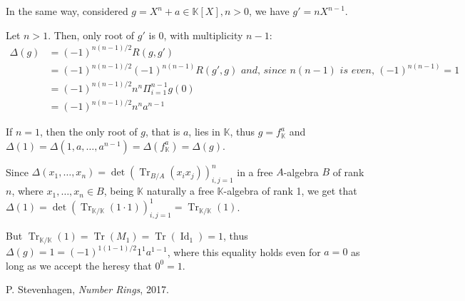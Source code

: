 \documentclass{article}
\newcommand{\numberset}{\mathbb}
\newcommand{\K}{\numberset{K}}
\newcommand{\Id}{\operatorname{Id}}
\newcommand{\Tr}{\operatorname{Tr}}
\begin{document}
In the same way, considered $g=X^n+a\in\K[X], n>0$, we have $g'=nX^{n-1}$.

Let $n>1$. Then, only root of $g'$ is $0$, with multiplicity $n-1$:
\begin{align*}
		\Delta(g) & = (-1)^{n(n-1)/2}R(g,g') \\
		& = (-1)^{n(n-1)/2}(-1)^{n(n-1)}R(g',g)\textit{ and, since $n(n-1)$ is even, $(-1)^{n(n-1)}=1$} \\
		& = (-1)^{n(n-1)/2}n^n\Pi_{i=1}^{n-1} g(0) \\
		& = (-1)^{n(n-1)/2}n^n a^{n-1}
\end{align*}

If $n=1$, then the only root of $g$, that is $a$, lies in $\K$, thus $g=f^a_{\K}$ and $\Delta(1)=\Delta(1,a,\ldots,a^{n-1})=\Delta(f^a_{\K})=\Delta(g)$.

Since $\Delta(x_1,\ldots,x_n)=\det(\Tr_{B/A}(x_ix_j))^n_{i,j=1}$ in a free $A$-algebra $B$ of rank $n$, where $x_1,\ldots,x_n\in B$, being $\K$ naturally a free $\K$-algebra of rank 1, we get that $\Delta(1)=\det(\Tr_{\K/\K}(1\cdot 1))^1_{i,j=1}=\Tr_{\K/\K}(1)$.

But $\Tr_{\K/\K}(1)=\Tr(M_1)=\Tr(\Id_1)=1$, thus $\Delta(g)=1=(-1)^{1(1-1)/2}1^1a^{1-1}$, where this equality holds even for $a=0$ as long as we accept the heresy that $0^0=1$.


\begin{thebibliography}{9}
		P. Stevenhagen,
		\textit{Number Rings},
		2017.
\end{thebibliography}
\end{document}
